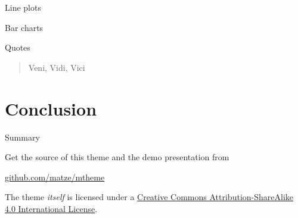 \documentclass[10pt, compress]{beamer}
\begin{document}
\begin{frame}{Line plots}
  \begin{figure}
  \end{figure}
\end{frame}
\begin{frame}{Bar charts}
  \begin{figure}
  \end{figure}
\end{frame}
\begin{frame}{Quotes}
  \begin{quote}
    Veni, Vidi, Vici
  \end{quote}
\end{frame}


\section{Conclusion}

\begin{frame}{Summary}

  Get the source of this theme and the demo presentation from

  \begin{center}\url{github.com/matze/mtheme}\end{center}

  The theme \emph{itself} is licensed under a
  \href{http://creativecommons.org/licenses/by-sa/4.0/}{Creative Commons
  Attribution-ShareAlike 4.0 International License}.

  \begin{center}\ccbysa\end{center}

\end{frame}

\end{document}
